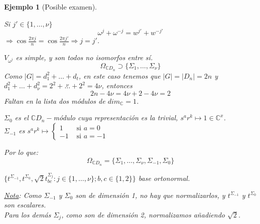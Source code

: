 \documentclass[11pt,a4paper]{article}
\theoremstyle{break}
\newtheorem{example}[theorem]{Ejemplo}
\begin{document}
\begin{example}[Posible examen]
\begin{enumerate}
Si $j' \in \{1, \dots, \nu\}$
$$\omega^{j} + \omega^{-j} = w^{j'} + w^{-j'}$$
$\Rightarrow \cos \frac{2 \pi j}{n} = \cos \frac{2 \pi j'}{n} \Rightarrow j = j'$.

$V_{\omega^{j}}$ es simple, y son todos no isomorfos entre sí.
$$\Omega_{\mathbb{C}D_{n}} \supset \{\Sigma_{1}, \dots, \Sigma_{\nu}\}$$
Como $|G| = d_{1}^{2} + \dots + d_{t}$, en este caso tenemos que $|G| = |D_{n}| = 2n$ y $d_{1}^{2} + \dots + d_{\nu}^{2} = 2^{2} + \overset{\nu}{\dots} + 2^{2} = 4\nu$, entonces
$$2n - 4\nu = 4\nu + 2 - 4\nu = 2$$
Faltan en la lista dos módulos de $dim_{\mathbb{C}}=1$. 

$\Sigma_{0}$ es el $\mathbb{C}D_{n}-$módulo cuya representación es la trivial, $s^{a}r^{k} \mapsto 1 \in \mathbb{C}^{x}$. \\
$\Sigma_{-1}$ es $s^{a}r^{k} \mapsto \begin{cases}
1 & \text{ si } a = 0 \\
-1 & \text{ si } a = -1
\end{cases}$

Por lo que:
$$\Omega_{\mathbb{C}D_{n}} = \{\Sigma_{1}, \dots, \Sigma_{\nu}, \Sigma_{-1}, \Sigma_{0}\}$$

$\{t^{\Sigma_{-1}}, t^{\Sigma_{0}}, \sqrt{2} t^{\Sigma_{j}}_{bc}: j \in \{1, \dots, \nu\}; b, c \in \{1, 2\}\}$ base ortonormal.

\underline{Nota}: Como $\Sigma_{-1}$ y $\Sigma_{0}$ son de dimensión 1, no hay que normalizarlos, y $t^{\Sigma_{-1}}$ y $t^{\Sigma_{0}}$ son escalares. \\
Para los demás $\Sigma_{j}$, como son de dimensión 2, normalizamos añadiendo $\sqrt{2}$.


\end{enumerate}
\end{example}
\end{document}

